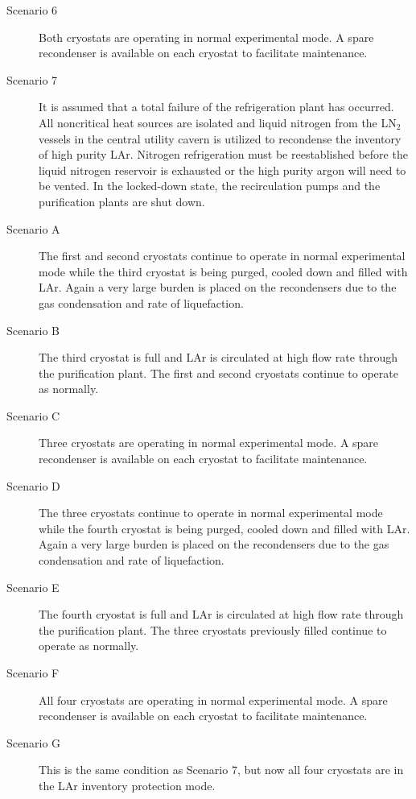 \begin{description}
\item[Scenario 6]
Both cryostats are operating in normal experimental mode. A spare 
recondenser is available on each cryostat to facilitate maintenance.

\item[Scenario 7]
It is assumed that a total failure of the refrigeration plant has 
occurred. All noncritical heat sources are isolated and liquid 
nitrogen from the LN$_2$ vessels in the central utility cavern 
is utilized to recondense the inventory of high purity LAr. Nitrogen 
refrigeration must be reestablished before the liquid nitrogen reservoir 
is exhausted or the high purity argon will need to be vented. In the 
locked-down state, the recirculation pumps and the purification 
plants are shut down.

\item[Scenario A]
The first and second cryostats continue to operate in normal
experimental mode while  the third cryostat is being purged, 
cooled down and filled with LAr. Again a very large burden 
is placed on the recondensers due to the gas condensation 
and rate of liquefaction.

\item[Scenario B]
The third cryostat is full and LAr is circulated at high 
flow rate through the purification plant. The first and 
second cryostats continue to operate as normally.

\item[Scenario C]
Three cryostats are operating in normal experimental mode. A spare 
recondenser is available on each cryostat to facilitate maintenance.

\item[Scenario D]
The three cryostats continue to operate in normal experimental
mode while the fourth cryostat is being purged, cooled down 
and filled with LAr. Again a very large burden is placed 
on the recondensers due to the gas condensation 
and rate of liquefaction.

\item[Scenario E]
The fourth cryostat is full and LAr is circulated at high 
flow rate through the purification plant. The three cryostats 
previously filled continue to operate as normally.

\item[Scenario F]
All four cryostats are operating in normal experimental mode. A spare 
recondenser is available on each cryostat to facilitate maintenance.

\item[Scenario G]
This is the same condition as Scenario 7, but now all four cryostats
are in the LAr inventory protection mode.

\end{description}
 
